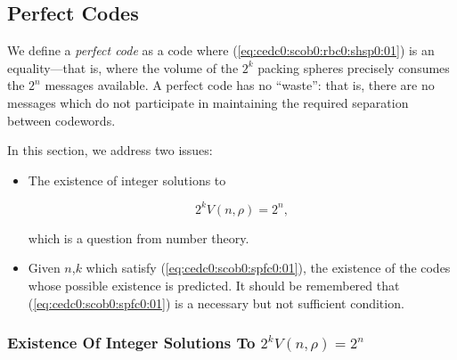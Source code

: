 \subsection{Perfect Codes}
\label{cedc0:scob0:spfc0}

We define a \emph{perfect code} as a code 
where (\ref{eq:cedc0:scob0:rbc0:shsp0:01})
is an equality---that is, where the volume of the $2^k$ packing spheres precisely
consumes the $2^n$ messages available.  A perfect code has no ``waste'':  that is, 
there are no messages which do not participate in maintaining the required separation
between codewords.

In this section, we address two issues:

\begin{itemize}
\item The existence of integer solutions to

      \begin{equation}
      \label{eq:cedc0:scob0:spfc0:01}
      2^k V(n, \rho) = 2^n ,
      \end{equation}

      which is a question from number theory.

\item Given $n$,$k$ which satisfy (\ref{eq:cedc0:scob0:spfc0:01}), the existence
      of the codes whose possible existence is predicted.  It should be remembered
      that  (\ref{eq:cedc0:scob0:spfc0:01}) is a necessary but not sufficient 
      condition.
\end{itemize}


\subsubsection[Existence Of Integer Solutions To 
               \protect\mbox{\protect$2^k V(n, \rho) = 2^n$}]
              {Existence Of Integer Solutions To 
               \protect\mbox{\protect\boldmath$2^k V(n, \rho) = 2^n$}}
\label{cedc0:scob0:spfc0:seis0}



